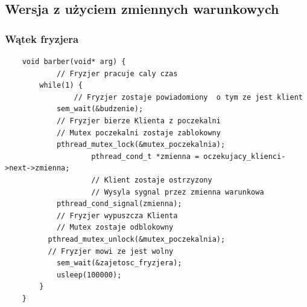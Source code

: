 \documentclass[12pt,a4paper]{article}
\begin{document}
 	\subsection{Wersja z użyciem zmiennych warunkowych}
 	\subsubsection{Wątek fryzjera}
	\begin{lstlisting}
	void barber(void* arg) {
			// Fryzjer pracuje caly czas
    	while(1) {
    			// Fryzjer zostaje powiadomiony  o tym ze jest klient
        	sem_wait(&budzenie);
        	// Fryzjer bierze Klienta z poczekalni
        	// Mutex poczekalni zostaje zablokowny
	        pthread_mutex_lock(&mutex_poczekalnia);
					pthread_cond_t *zmienna = oczekujacy_klienci->next->zmienna;
					// Klient zostaje ostrzyzony
					// Wysyla sygnal przez zmienna warunkowa
        	pthread_cond_signal(zmienna);     	   	
        	// Fryzjer wypuszcza Klienta
     	   	// Mutex zostaje odblokowny
      	  pthread_mutex_unlock(&mutex_poczekalnia);
      	  // Fryzjer mowi ze jest wolny
     	   	sem_wait(&zajetosc_fryzjera);
        	usleep(100000);
	    }
	}
	\end{lstlisting}
	\pagebreak
\end{document}
